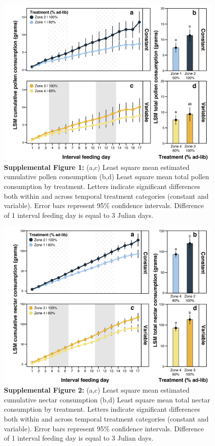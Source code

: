 \documentclass[11pt,]{article}
\begin{document}
\begin{figure}
\centering
\includegraphics{./supfig1_pollen.png}
\caption{\textbf{Supplemental Figure 1:} (a,c) Least square mean
estimated cumulative pollen consumption (b,d) Least square mean total
pollen consumption by treatment. Letters indicate significant
differences both within and across temporal treatment categories
(constant and variable). Error bars represent 95\% confidence intervals.
Difference of 1 interval feeding day is equal to 3 Julian days.}
\end{figure}

\begin{figure}
\centering
\includegraphics{./supfig2_nectar.png}
\caption{\textbf{Supplemental Figure 2:} (a,c) Least square mean
estimated cumulative nectar consumption (b,d) Least square mean total
nectar consumption by treatment. Letters indicate significant
differences both within and across temporal treatment categories
(constant and variable). Error bars represent 95\% confidence intervals.
Difference of 1 interval feeding day is equal to 3 Julian days.}
\end{figure}
\end{document}
